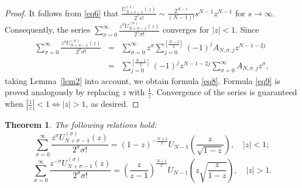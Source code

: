 \documentclass{article}
\newtheorem{thm}{Theorem}[section]
\begin{document}
\begin{proof}
It follows from \eqref{eq6} that $\displaystyle \frac{U_{N+s-1}^{(s)}(z)}{2^s s!} \sim  \frac{2^{N-1}}{(N-1)!}s^{N-1}z^{N-1}$ for $s \rightarrow \infty$. Consequently, the series $\displaystyle \sum_{\sigma = 0}^{\infty}\frac{z^\sigma U_{N+\sigma-1}^{(\sigma)}(z)}{2^\sigma \sigma!}$ converges for $|z| < 1$. Since
\begin{eqnarray*}
\sum_{\sigma = 0}^{\infty}\frac{z^\sigma U_{N+\sigma-1}^{(\sigma)}(z)}{2^\sigma \sigma!} &=& \sum_{\sigma = 0}^{\infty}z^\sigma\sum_{j = 0}^{\left[\frac{N-1}{2}\right]}(-1)^jA_{N,\sigma,j}z^{N-1-2j} \\
&=& \sum_{j = 0}^{\left[\frac{N-1}{2}\right]}(-1)^jz^{N-1-2j}\sum_{\sigma = 0}^{\infty}A_{N,\sigma,j}z^\sigma,
\end{eqnarray*}
taking Lemma~\ref{lem2} into account, we obtain formula \eqref{eq8}. Formula \eqref{eq9} is proved analogously by replacing $z$ with $\frac{1}{z}$. Convergence of the series is guaranteed when $\left|\frac{1}{z}\right| < 1 \Leftrightarrow |z| > 1$, as desired.
\end{proof}

\begin{thm}\label{thm4}
The following relations hold:
\begin{equation}\label{eq10}
\sum_{\sigma = 0}^{\infty} \frac{z^\sigma U_{N+\sigma-1}^{(\sigma)}(z)}{2^\sigma \sigma!} = (1 - z)^{-\frac{N+1}{2}}U_{N-1}\left(\frac{z}{\sqrt{1-z}}\right), \quad |z| < 1;
\end{equation}
\begin{equation}\label{eq11}
\sum_{\sigma = 0}^{\infty} \frac{z^{-\sigma} U_{N+\sigma-1}^{(\sigma)}(z)}{2^\sigma \sigma!} = \left(\frac{z}{z-1}\right)^{\frac{N+1}{2}}U_{N-1}\left(z\sqrt{\frac{z}{1-z}}\right), \quad |z| > 1.
\end{equation}
\end{thm}
\end{document}
